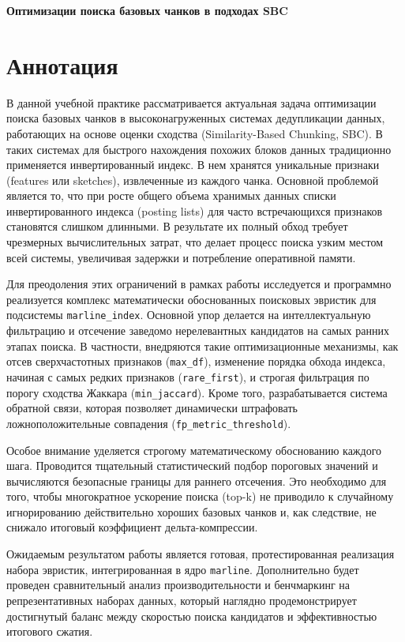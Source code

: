 \documentclass[a4paper,14pt]{extarticle}
\begin{document}
\begin{center}
    \textbf{\Large Оптимизации поиска базовых чанков в подходах SBC}
\end{center}

\vspace{1em}

\section*{Аннотация}

В данной учебной практике рассматривается актуальная задача оптимизации поиска базовых чанков в высоконагруженных системах дедупликации данных, работающих на основе оценки сходства (Similarity-Based Chunking, SBC). В таких системах для быстрого нахождения похожих блоков данных традиционно применяется инвертированный индекс. В нем хранятся уникальные признаки (features или sketches), извлеченные из каждого чанка. Основной проблемой является то, что при росте общего объема хранимых данных списки инвертированного индекса (posting lists) для часто встречающихся признаков становятся слишком длинными. В результате их полный обход требует чрезмерных вычислительных затрат, что делает процесс поиска узким местом всей системы, увеличивая задержки и потребление оперативной памяти.

Для преодоления этих ограничений в рамках работы исследуется и программно реализуется комплекс математически обоснованных поисковых эвристик для подсистемы \texttt{marline\_index}. Основной упор делается на интеллектуальную фильтрацию и отсечение заведомо нерелевантных кандидатов на самых ранних этапах поиска. В частности, внедряются такие оптимизационные механизмы, как отсев сверхчастотных признаков (\texttt{max\_df}), изменение порядка обхода индекса, начиная с самых редких признаков (\texttt{rare\_first}), и строгая фильтрация по порогу сходства Жаккара (\texttt{min\_jaccard}). Кроме того, разрабатывается система обратной связи, которая позволяет динамически штрафовать ложноположительные совпадения (\texttt{fp\_metric\_threshold}).

Особое внимание уделяется строгому математическому обоснованию каждого шага. Проводится тщательный статистический подбор пороговых значений и вычисляются безопасные границы для раннего отсечения. Это необходимо для того, чтобы многократное ускорение поиска (top-k) не приводило к случайному игнорированию действительно хороших базовых чанков и, как следствие, не снижало итоговый коэффициент дельта-компрессии.

Ожидаемым результатом работы является готовая, протестированная реализация набора эвристик, интегрированная в ядро \texttt{marline}. Дополнительно будет проведен сравнительный анализ производительности и бенчмаркинг на репрезентативных наборах данных, который наглядно продемонстрирует достигнутый баланс между скоростью поиска кандидатов и эффективностью итогового сжатия.
\end{document}
